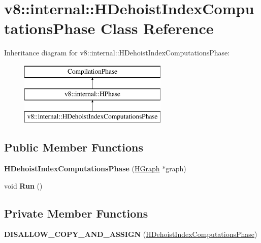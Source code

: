 \hypertarget{classv8_1_1internal_1_1_h_dehoist_index_computations_phase}{}\section{v8\+:\+:internal\+:\+:H\+Dehoist\+Index\+Computations\+Phase Class Reference}
\label{classv8_1_1internal_1_1_h_dehoist_index_computations_phase}
Inheritance diagram for v8\+:\+:internal\+:\+:H\+Dehoist\+Index\+Computations\+Phase\+:\begin{figure}[H]
\begin{center}
\leavevmode
\includegraphics[height=3.000000cm]{classv8_1_1internal_1_1_h_dehoist_index_computations_phase}
\end{center}
\end{figure}
\subsection*{Public Member Functions}
\begin{DoxyCompactItemize}
\item 
{\bfseries H\+Dehoist\+Index\+Computations\+Phase} (\hyperlink{classv8_1_1internal_1_1_h_graph}{H\+Graph} $\ast$graph)\hypertarget{classv8_1_1internal_1_1_h_dehoist_index_computations_phase_a91a58aca8baa306f4cf62dc5b66a36ed}{}\label{classv8_1_1internal_1_1_h_dehoist_index_computations_phase_a91a58aca8baa306f4cf62dc5b66a36ed}

\item 
void {\bfseries Run} ()\hypertarget{classv8_1_1internal_1_1_h_dehoist_index_computations_phase_a3ce3a283ea371cedf8c7c5e24598a29d}{}\label{classv8_1_1internal_1_1_h_dehoist_index_computations_phase_a3ce3a283ea371cedf8c7c5e24598a29d}

\end{DoxyCompactItemize}
\subsection*{Private Member Functions}
\begin{DoxyCompactItemize}
\item 
{\bfseries D\+I\+S\+A\+L\+L\+O\+W\+\_\+\+C\+O\+P\+Y\+\_\+\+A\+N\+D\+\_\+\+A\+S\+S\+I\+GN} (\hyperlink{classv8_1_1internal_1_1_h_dehoist_index_computations_phase}{H\+Dehoist\+Index\+Computations\+Phase})\hypertarget{classv8_1_1internal_1_1_h_dehoist_index_computations_phase_a3701ae926d619fc4163c21b047a5871b}{}\label{classv8_1_1internal_1_1_h_dehoist_index_computations_phase_a3701ae926d619fc4163c21b047a5871b}

\end{DoxyCompactItemize}
